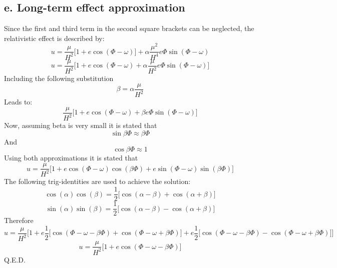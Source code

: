 \subsection{e. Long-term effect approximation}
Since the first and third term in the second square brackets can be neglected, the relativistic effect is described by:
\begin{equation}
u = \frac{\mu}{H^2}\Big[1+e\cos(\Phi-\omega)\Big] + \alpha \frac{\mu^2}{H^4}e \Phi \sin(\Phi-\omega)
\end{equation}
\begin{equation}
u = \frac{\mu}{H^2}\Big[1+e\cos(\Phi-\omega)+ \alpha \frac{\mu}{H^2}e \Phi \sin(\Phi-\omega)\Big]
\end{equation}
Including the following substitution
\begin{equation}
\beta = \alpha \frac{\mu}{H^2}
\end{equation}
Leads to:
\begin{equation}
\frac{\mu}{H^2}\Big[1+e\cos(\Phi-\omega) + \beta e \Phi \sin(\Phi-\omega)\Big]
\end{equation}
Now, assuming beta is very small it is stated that
\begin{equation}
\sin \beta \Phi \approx \beta \Phi
\end{equation}
And
\begin{equation}
\cos \beta \Phi \approx 1
\end{equation}
Using both approximations it is stated that
\begin{equation}
u = \frac{\mu}{H^2}\Big[1+e\cos(\Phi-\omega)\cos(\beta \Phi) + e \sin(\Phi-\omega) \sin(\beta \Phi)\Big]
\end{equation}
The following trig-identities are used to achieve the solution:
\begin{equation}
\cos(\alpha)\cos(\beta) = \frac{1}{2}\big[\cos(\alpha-\beta)+\cos(\alpha+\beta)\big]
\end{equation}
\begin{equation}
\sin(\alpha)\sin(\beta) = \frac{1}{2}\big[\cos(\alpha-\beta)-\cos(\alpha+\beta)\big]
\end{equation}
Therefore
\begin{equation}
u = \frac{\mu}{H^2}\Big[1+e\frac{1}{2}\big[\cos(\Phi-\omega - \beta \Phi)+\cos(\Phi-\omega + \beta \Phi)\big] + e \frac{1}{2}\big[\cos(\Phi-\omega-\beta \Phi)-\cos(\Phi-\omega + \beta \Phi)\big]\Big]
\end{equation}
\begin{equation}
u = \frac{\mu}{H^2}\Big[1 + e\cos(\Phi-\omega - \beta \Phi)\Big]
\end{equation}
Q.E.D.
